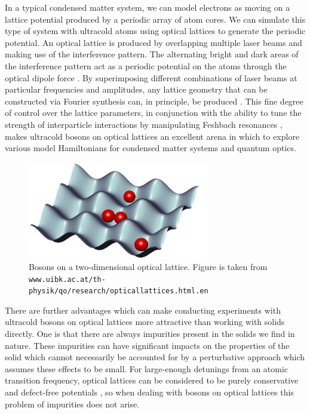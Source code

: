 \documentclass[a4paper, 10pt]{article}
\theoremstyle{plain}
\begin{document}
In a typical condensed matter system, we can model electrons as moving on a
lattice potential produced by a periodic array of atom cores. We can simulate
this type of system with ultracold atoms using optical lattices to generate the
periodic potential. An optical lattice is produced by overlapping multiple laser
beams and making use of the interference pattern. The alternating bright and
dark areas of the interference pattern act as a periodic potential on the atoms
through the optical dipole force \cite{Bloch2012}. By superimposing different
combinations of laser beams at particular frequencies and amplitudes, any
lattice geometry that can be constructed via Fourier synthesis can, in
principle, be produced \cite{Bloch2012}. This fine degree of control over the
lattice parameters, in conjunction with the ability to tune the strength of
interparticle interactions by manipulating Feshbach resonances \cite{Chin2010},
makes ultracold bosons on optical lattices an excellent arena in which to
explore various model Hamiltonians for condensed matter systems and quantum
optics.
\begin{figure}[bh!]
    \begin{center}
        \includegraphics[width=8cm]{bosons_on_lattice}
    \end{center}
    \caption{Bosons on a two-dimensional optical lattice. Figure is taken from\newline
             \texttt{www.uibk.ac.at/th-physik/qo/research/opticallattices.html.en}
            }
\end{figure}
There are further advantages which can make conducting experiments with
ultracold bosons on optical lattices more attractive than working with solids
directly. One is that there are always impurities present in the solids we find
in nature. These impurities can have significant impacts on the properties of
the solid which cannot necessarily be accounted for by a perturbative approach
which assumes these effects to be small.  For large-enough detunings from an atomic
transition frequency, optical lattices can be considered to be purely 
conservative and defect-free potentials \cite{Bloch2012}, so when dealing with 
bosons on optical lattices this problem of impurities does not arise.
\end{document}
